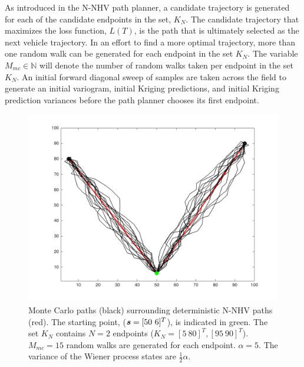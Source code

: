As introduced in the N-NHV path planner, a candidate trajectory is generated for each of the candidate endpoints in the set, $K_N$. The candidate trajectory that maximizes the loss function, $L(T)$, is the path that is ultimately selected as the next vehicle trajectory. In an effort to find a more optimal trajectory, more than one random walk can be generated for each endpoint in the set $K_N$. The variable $M_{mc} \in \mathbb{N}$ will denote the number of random walks taken per endpoint in the set $K_N$. An initial forward diagonal sweep of samples are taken across the field to generate an initial variogram, initial Kriging predictions, and initial Kriging prediction variances before the path planner chooses its first endpoint.

\begin{figure}[h!]
	\centering
	\includegraphics[width=0.8\linewidth]{figures/brownian_motion_mc.png}
	\ssp
	\caption{ Monte Carlo paths (black) surrounding deterministic N-NHV paths (red). The starting point, (${\it{\boldsymbol{s}}} = [50 \ 6]^T$), is indicated in green. The set $K_N$ contains $N=2$ endpoints ($K_N = [ 5 \ 80 ]^T, [ 95 \ 90]^T$). $M_{mc}=15$ random walks are generated for each endpoint. $\alpha=5$. The variance of the Wiener process states are $\frac{1}{2} \alpha$.}

\end{figure}



